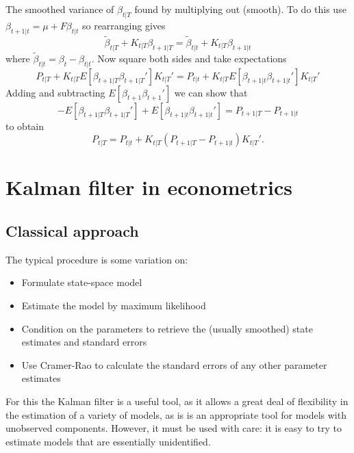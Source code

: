 \documentclass[
  letterpaper,
]{book}
\providecommand{\tightlist}{%
  \setlength{\itemsep}{0pt}\setlength{\parskip}{0pt}}\usepackage{longtable,booktabs,array}
\begin{document}
The smoothed variance of \(\beta_{t|T}\) found by multiplying out
(smooth). To do this use \(\beta_{t+1|t} = \mu + F\beta_{t|t}\) so
rearranging gives \begin{equation}
  \widetilde{\beta}_{t|T} + K_{t|T}\beta_{t+1|T} = \widetilde{\beta}_{t|t}+K_{t|T}\beta_{t+1|t}
\end{equation} where \(\widetilde{\beta}_{t|t}=\beta_t-\beta_{t|t}\).
Now square both sides and take expectations \begin{equation}
  P_{t|T} + K_{t|T} E\left[\beta_{t+1|T}\beta_{t+1|T}' \right] K_{t|T}' = P_{t|t} + K_{t|T} E\left[ \beta_{t+1|t} \beta_{t+1|t}' \right] K_{t|T}'
\end{equation} Adding and subtracting \(E[\beta_{t+1}\beta_{t+1}']\) we
can show that \begin{equation}
-E\left[\beta_{t+1|T}\beta_{t+1|T}'\right] + E\left[\beta_{t+1|t}\beta_{t+1|t}'\right] = P_{t+1|T}-P_{t+1|t}
\end{equation} to obtain \begin{equation}
  P_{t|T} = P_{t|t} + K_{t|T} (P_{t+1|T}-P_{t+1|t}) K_{t|T}'.
\end{equation}

\hypertarget{kalman-filter-in-econometrics}{%
\section{Kalman filter in
econometrics}\label{kalman-filter-in-econometrics}}

\hypertarget{classical-approach}{%
\subsection{Classical approach}\label{classical-approach}}

The typical procedure is some variation on:

\begin{itemize}
\tightlist
\item
  Formulate state-space model
\item
  Estimate the model by maximum likelihood
\item
  Condition on the parameters to retrieve the (usually smoothed) state
  estimates and standard errors
\item
  Use Cramer-Rao to calculate the standard errors of any other parameter
  estimates
\end{itemize}

For this the Kalman filter is a useful tool, as it allows a great deal
of flexibility in the estimation of a variety of models, as is is an
appropriate tool for models with unobserved components. However, it must
be used with care: it is easy to try to estimate models that are
essentially unidentified.
\end{document}
